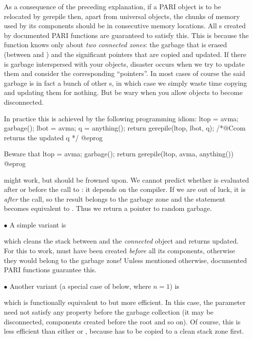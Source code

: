 As a consequence of the preceding explanation, if a PARI object is to be
relocated by \hbox{gerepile} then, apart from universal objects, the chunks
of memory used by its components should be in consecutive memory locations.
All s created by documented PARI functions are guaranteed to satisfy
this. This is because the  function knows only about \emph{two
connected zones}: the garbage that is erased (between  and
) and the significant pointers that are copied and updated. If
there is garbage interspersed with your objects, disaster occurs when we try
to update them and consider the corresponding ``pointers''. In most cases of
course the said garbage is in fact a bunch of other s, in which case
we simply waste time copying and updating them for nothing. But be wary when
you allow objects to become disconnected.

\noindent In practice this is achieved by the following programming idiom:
\bprog
  ltop = avma; garbage(); lbot = avma; q = anything();
  return gerepile(ltop, lbot, q); /*@Ccom returns the updated q */
@eprog

\noindent Beware that
\bprog
  ltop = avma; garbage();
  return gerepile(ltop, avma, anything())
@eprog

\noindent might work, but should be frowned upon. We cannot predict whether
 is evaluated after or before the call to : it
depends on the compiler. If we are out of luck, it is \emph{after} the
call, so the result belongs to the garbage zone and the 
statement becomes equivalent to . Thus we return a
pointer to random garbage.

\noindent$\bullet$ A simple variant is


\noindent which cleans the stack between  and the \emph{connected}
object  and returns  updated. For this to work,  must
have been created \emph{before} all its components, otherwise they would
belong to the garbage zone! Unless mentioned otherwise, documented PARI
functions guarantee this.

\noindent$\bullet$ Another variant (a special case of 
below, where $n=1$) is


\noindent which is functionally equivalent to  but more efficient. In this case, the  parameter 
need not satisfy any property before the garbage collection (it may be
disconnected, components created before the root and so on). Of course, this
is less efficient than either  or , because
 has to be copied to a clean stack zone first.

